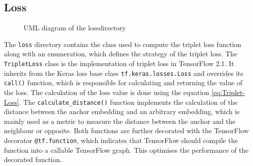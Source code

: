 \subsection{Loss}
\label{sub:Component-Loss}
\begin{figure}[htbp]
	\centering
	\caption{UML diagram of the \flqq loss\frqq directory}
	\label{fig:UML-Loss}
\end{figure}
\noindent
The \texttt{loss} directory contains the class used to compute the triplet loss function along with an enumeration, which defines the strategy of the triplet loss. The \texttt{TripletLoss} class is the implementation of triplet loss in TensorFlow 2.1. It inherits from the Keras loss base class \texttt{tf.keras.losses.Loss} and overrides its \texttt{call()} function, which is responsible for calculating and returning the value of the loss. The calculation of the loss value is done using the equation \ref{eq:Triplet-Loss}. The \texttt{calculate\_distance()} function implements the calculation of the distance between the anchor embedding and an arbitrary embedding, which is mainly used as a metric to measure the distance between the anchor and the neighbour or opposite. Both functions are further decorated with the TensorFlow decorator \texttt{@tf.function}, which indicates that TensorFlow should compile the function into a callable TensorFlow graph. This optimises the performance of the decorated function.
